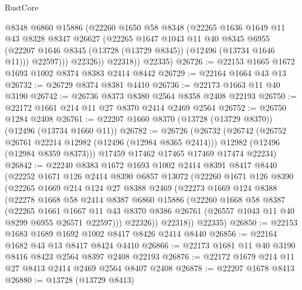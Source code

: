 \begin{lexlean}{RustCore}
\begin{coremodule}
              @8348
              @6860
              @15886
              (@22260
                @1650
                @58
                @8348
                (@22265
                  @1636
                  @1649
                  @11
                  @43
                  @8328
                  @8347
                  @26627
                  (@22265
                    @1647
                    @1043
                    @11
                    @40
                    @8345
                    @6955
                    (@22207 @1646 @8345 (@13728 (@13729 @8345)) (@12496 (@13734 @1646 @11)))
                    @22597)))
              @22326))
          @22318))
      @22335)
@26726 := @22153 @1665 @1672 @1693 @1002 @8374 @8383 @2414 @8442
@26729 := @22164 @1664 @43 @13
@26732 := @26729 @8374 @8381 @4410
@26736 := @22173 @1663 @11 @40 @3190
@26742 := @26736 @8373 @8380 @2564 @8358 @2408 @22193
@26750 := @22172 @1661 @214 @11 @27 @8370 @2414 @2469 @2564
@26752 := @26750 @1284 @2408
@26761 := @22207 @1660 @8370 (@13728 (@13729 @8370)) (@12496 (@13734 @1660 @11))
@26782 := @26726
    (@26732
      (@26742
        (@26752 @26761 @22214 @12982 (@12496 (@12984 @8365 @2414)))
        @12982
        (@12496 (@12984 @8359 @8373)))
      @17459
      @17462
      @17465
      @17469
      @17474
      @22234)
@26842 := @22240
    @8383
    @1672
    @1693
    @1002
    @2414
    @8391
    @8417
    @8440
    (@22252
      @1671
      @126
      @2414
      @8390
      @6857
      @13072
      (@22260
        @1671
        @126
        @8390
        (@22265
          @1669
          @214
          @124
          @27
          @8388
          @2469
          (@22273
            @1669
            @124
            @8388
            (@22278
              @1668
              @58
              @2414
              @8387
              @6860
              @15886
              (@22260
                @1668
                @58
                @8387
                (@22265
                  @1661
                  @1667
                  @11
                  @43
                  @8370
                  @8386
                  @26761
                  (@26557 @1043 @11 @40 @8299 @6955 @26571 @22597)))
              @22326))
          @22318))
      @22335)
@26850 := @22153 @1683 @1689 @1692 @1002 @8417 @8426 @2414 @8440
@26856 := @22164 @1682 @43 @13 @8417 @8424 @4410
@26866 := @22173 @1681 @11 @40 @3190 @8416 @8423 @2564 @8397 @2408 @22193
@26876 := @22172 @1679 @214 @11 @27 @8413 @2414 @2469 @2564 @8407 @2408
@26878 := @22207 @1678 @8413
@26880 := @13728 (@13729 @8413)

\end{coremodule}
\end{lexlean}
